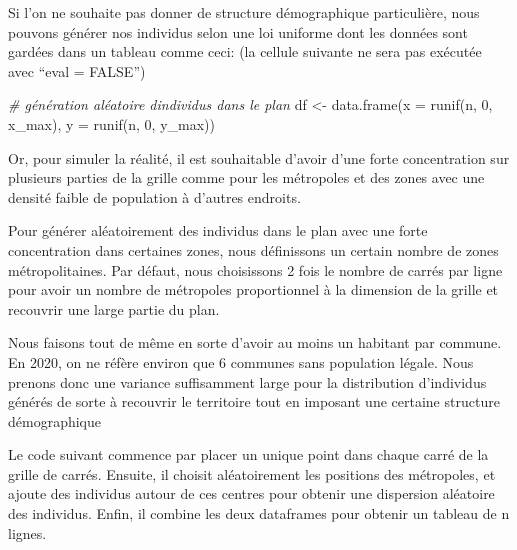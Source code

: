 \documentclass[
]{article}
\newenvironment{Shaded}{\begin{snugshade}}{\end{snugshade}}
\newcommand{\AttributeTok}[1]{\textcolor[rgb]{0.77,0.63,0.00}{#1}}
\newcommand{\CommentTok}[1]{\textcolor[rgb]{0.56,0.35,0.01}{\textit{#1}}}
\newcommand{\DecValTok}[1]{\textcolor[rgb]{0.00,0.00,0.81}{#1}}
\newcommand{\FunctionTok}[1]{\textcolor[rgb]{0.00,0.00,0.00}{#1}}
\newcommand{\NormalTok}[1]{#1}
\newcommand{\OtherTok}[1]{\textcolor[rgb]{0.56,0.35,0.01}{#1}}
\begin{document}
Si l'on ne souhaite pas donner de structure démographique particulière,
nous pouvons générer nos individus selon une loi uniforme dont les
données sont gardées dans un tableau comme ceci: (la cellule suivante ne
sera pas exécutée avec ``eval = FALSE'')

\begin{Shaded}
\begin{Highlighting}[]
\CommentTok{\# génération aléatoire d\textquotesingle{}individus dans le plan}
\NormalTok{df }\OtherTok{\textless{}{-}} \FunctionTok{data.frame}\NormalTok{(}\AttributeTok{x =} \FunctionTok{runif}\NormalTok{(n, }\DecValTok{0}\NormalTok{, x\_max),}
                 \AttributeTok{y =} \FunctionTok{runif}\NormalTok{(n, }\DecValTok{0}\NormalTok{, y\_max))}
\end{Highlighting}
\end{Shaded}

Or, pour simuler la réalité, il est souhaitable d'avoir d'une forte
concentration sur plusieurs parties de la grille comme pour les
métropoles et des zones avec une densité faible de population à d'autres
endroits.

Pour générer aléatoirement des individus dans le plan avec une forte
concentration dans certaines zones, nous définissons un certain nombre
de zones métropolitaines. Par défaut, nous choisissons 2 fois le nombre
de carrés par ligne pour avoir un nombre de métropoles proportionnel à
la dimension de la grille et recouvrir une large partie du plan.

Nous faisons tout de même en sorte d'avoir au moins un habitant par
commune. En 2020, on ne réfère environ que 6 communes sans population
légale. Nous prenons donc une variance suffisamment large pour la
distribution d'individus générés de sorte à recouvrir le territoire tout
en imposant une certaine structure démographique

Le code suivant commence par placer un unique point dans chaque carré de
la grille de carrés. Ensuite, il choisit aléatoirement les positions des
métropoles, et ajoute des individus autour de ces centres pour obtenir
une dispersion aléatoire des individus. Enfin, il combine les deux
dataframes pour obtenir un tableau de n lignes.
\end{document}
